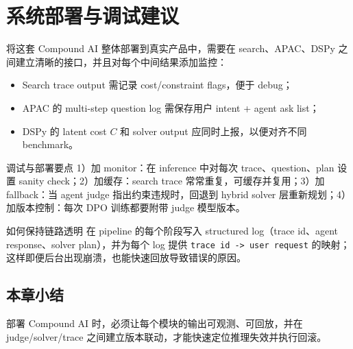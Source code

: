 \section{系统部署与调试建议}

将这套 Compound AI 整体部署到真实产品中，需要在 search、APAC、DSPy 之间建立清晰的接口，并且对每个中间结果添加监控：
\begin{itemize}
    \item Search trace output 需记录 cost/constraint flags，便于 debug；
    \item APAC 的 multi-step question log 需保存用户 intent + agent ask list；
    \item DSPy 的 latent cost \(C\) 和 solver output 应同时上报，以便对齐不同 benchmark。
\end{itemize}

\begin{importantbox}{调试与部署要点}
1）加 monitor：在 inference 中对每次 trace、question、plan 设置 sanity check；2）加缓存：search trace 常常重复，可缓存并复用；3）加 fallback：当 agent judge 指出约束违规时，回退到 hybrid solver 层重新规划；4）加版本控制：每次 DPO 训练都要附带 judge 模型版本。
\end{importantbox}

\begin{knowledgebox}{如何保持链路透明}
在 pipeline 的每个阶段写入 structured log（trace id、agent response、solver plan），并为每个 log 提供 \texttt{trace id -> user request} 的映射；这样即便后台出现崩溃，也能快速回放导致错误的原因。
\end{knowledgebox}

\subsection{本章小结}

部署 Compound AI 时，必须让每个模块的输出可观测、可回放，并在 judge/solver/trace 之间建立版本联动，才能快速定位推理失效并执行回滚。

